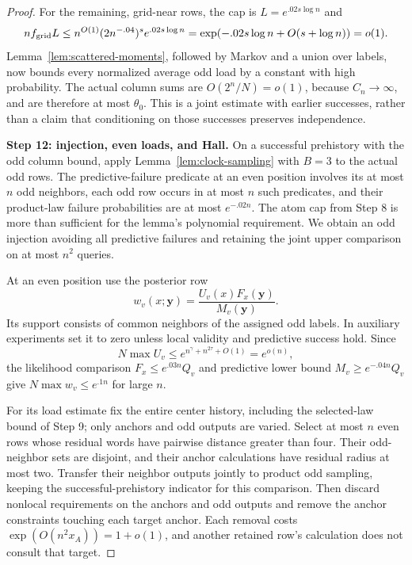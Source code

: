 \begin{proof}
For the remaining, grid-near rows, the cap is
\(L=e^{.02s\log n}\) and
\[
 nf_{\rm grid}L
 \le n^{O(1)}(2n^{-.04})^s e^{.02s\log n}
 =\exp(-.02s\log n+O(s+\log n))=o(1).
\]
Lemma~\ref{lem:scattered-moments}, followed by Markov and a union over labels, now bounds every normalized average odd load by a constant with high probability. The actual column sums are \(O(2^n/N)=o(1)\), because \(C_n\to\infty\), and are therefore at most \(\theta_0\). This is a joint estimate with earlier successes, rather than a claim that conditioning on those successes preserves independence.

\noindent\textbf{Step 12: injection, even loads, and Hall.}\quad
On a successful prehistory with the odd column bound, apply Lemma~\ref{lem:clock-sampling} with \(B=3\) to the actual odd rows. The predictive-failure predicate at an even position involves its at most \(n\) odd neighbors, each odd row occurs in at most \(n\) such predicates, and their product-law failure probabilities are at most \(e^{-.02n}\). The atom cap from Step 8 is more than sufficient for the lemma's polynomial requirement. We obtain an odd injection avoiding all predictive failures and retaining the joint upper comparison on at most \(n^2\) queries.

At an even position use the posterior row
\[
 w_v(x;\boldsymbol y)
       =\frac{U_v(x)F_x(\boldsymbol y)}{M_v(\boldsymbol y)}.
\]
Its support consists of common neighbors of the assigned odd labels. In auxiliary experiments set it to zero unless local validity and predictive success hold. Since
\[
 N\max U_v\le e^{n^\gamma+n^{2\tau}+O(1)}=e^{o(n)},
\]
the likelihood comparison \(F_x\le e^{.03n}Q_v\) and predictive lower bound \(M_v\ge e^{-.04n}Q_v\) give
\(N\max w_v\le e^{.1n}\) for large \(n\).

For its load estimate fix the entire center history, including the selected-law bound of Step 9; only anchors and odd outputs are varied. Select at most \(n\) even rows whose residual words have pairwise distance greater than four. Their odd-neighbor sets are disjoint, and their anchor calculations have residual radius at most two. Transfer their neighbor outputs jointly to product odd sampling, keeping the successful-prehistory indicator for this comparison. Then discard nonlocal requirements on the anchors and odd outputs and remove the anchor constraints touching each target anchor. Each removal costs \(\exp(O(n^2x_A))=1+o(1)\), and another retained row's calculation does not consult that target.


\end{proof}
